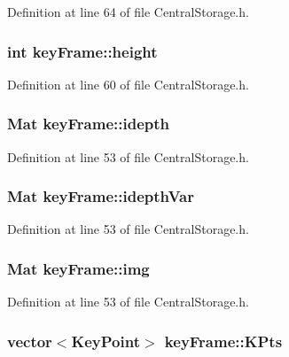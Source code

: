 \-Definition at line 64 of file \-Central\-Storage.\-h.

\hypertarget{structkeyFrame_aa4b6b580b1cab2933803379a9fce0e0d}{
\subsubsection[{height}]{\setlength{\rightskip}{0pt plus 5cm}int {\bf key\-Frame\-::height}}}\label{structkeyFrame_aa4b6b580b1cab2933803379a9fce0e0d}


\-Definition at line 60 of file \-Central\-Storage.\-h.

\hypertarget{structkeyFrame_ac952ad626e928e521c6663e611820dac}{
\subsubsection[{idepth}]{\setlength{\rightskip}{0pt plus 5cm}\-Mat {\bf key\-Frame\-::idepth}}}\label{structkeyFrame_ac952ad626e928e521c6663e611820dac}


\-Definition at line 53 of file \-Central\-Storage.\-h.

\hypertarget{structkeyFrame_a3b7c27c0435f84c12a86c00e22cfaa81}{
\subsubsection[{idepth\-Var}]{\setlength{\rightskip}{0pt plus 5cm}\-Mat {\bf key\-Frame\-::idepth\-Var}}}\label{structkeyFrame_a3b7c27c0435f84c12a86c00e22cfaa81}


\-Definition at line 53 of file \-Central\-Storage.\-h.

\hypertarget{structkeyFrame_a59576f76e321ecb82062edc5c7bc08fe}{
\subsubsection[{img}]{\setlength{\rightskip}{0pt plus 5cm}\-Mat {\bf key\-Frame\-::img}}}\label{structkeyFrame_a59576f76e321ecb82062edc5c7bc08fe}


\-Definition at line 53 of file \-Central\-Storage.\-h.

\hypertarget{structkeyFrame_a420102716b1d90f44af48de225f241ba}{
\subsubsection[{\-K\-Pts}]{\setlength{\rightskip}{0pt plus 5cm}vector$<$\-Key\-Point$>$ {\bf key\-Frame\-::\-K\-Pts}}}\label{structkeyFrame_a420102716b1d90f44af48de225f241ba}


